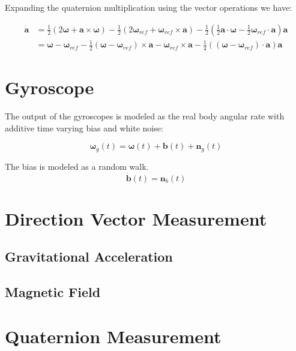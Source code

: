\documentclass[a4paper]{paper}
\begin{document}
Expanding the quaternion multiplication using the vector operations we have:

\begin{equation}
    \begin{split}
    \dot{\bm{a}} &=
        \frac{1}{2} (2 \bm{\omega} + \bm{a} \times \bm{\omega})
        - \frac{1}{2} (2 \bm{\omega}_{ref} + \bm{\omega}_{ref} \times \bm{a})
        - \frac{1}{2} \left(
            \frac{1}{2} \bm{a} \cdot \bm{\omega}
            - \frac{1}{2} \bm{\omega}_{ref} \cdot \bm{a}
        \right) \bm{a} \\
    &= \bm{\omega} - \bm{\omega}_{ref}
        - \frac{1}{2} (\bm{\omega} - \bm{\omega}_{ref}) \times \bm{a}
        - \bm{\omega}_{ref} \times \bm{a}
        - \frac{1}{4} ((\bm{\omega} - \bm{\omega}_{ref}) \cdot \bm{a}) \bm{a}
\end{split}
\label{eq:adot}
\end{equation}




\section{Gyroscope}

The output of the gyroscopes is modeled as the real body angular rate with additive time varying bias and white noise:

\begin{equation}
    \bm{\omega}_g(t) = \bm{\omega}(t) + \bm{b}(t) + \bm{n}_g(t)
\end{equation}

The bias is modeled as a random walk.
\begin{equation}
    \dot{\bm{b}}(t) = \bm{n}_b(t)
\end{equation}

\section{Direction Vector Measurement}

\subsection{Gravitational Acceleration}

\subsection{Magnetic Field}

\section{Quaternion Measurement}
\end{document}

